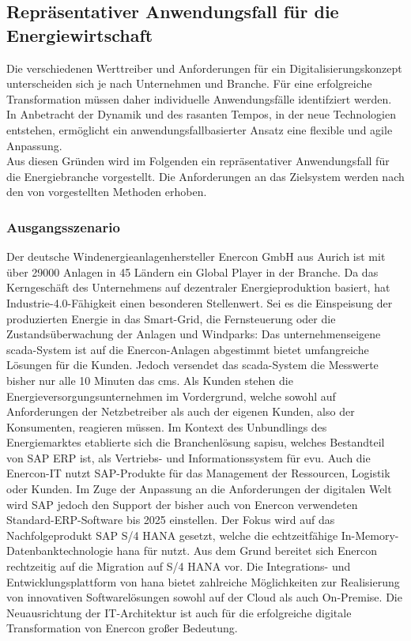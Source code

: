 \subsection{Repräsentativer Anwendungsfall für die Energiewirtschaft}\label{usecase}

Die verschiedenen Werttreiber und Anforderungen für ein Digitalisierungskonzept unterscheiden sich je nach Unternehmen und Branche.
Für eine erfolgreiche Transformation müssen daher individuelle Anwendungsfälle identifziert werden.
In Anbetracht der Dynamik und des rasanten Tempos, in der neue Technologien entstehen,
ermöglicht ein anwendungsfallbasierter Ansatz eine flexible und agile Anpassung. \citep[S. 31]{Acharya2019}
\\Aus diesen Gründen wird im Folgenden ein repräsentativer Anwendungsfall für die Energiebranche vorgestellt. Die Anforderungen an das Zielsystem werden nach den von \citet{Lauenroth2016} vorgestellten Methoden erhoben.

\subsubsection{Ausgangsszenario} \label{usecase}

Der deutsche Windenergieanlagenhersteller Enercon GmbH aus Aurich ist mit über 29000 Anlagen in 45 Ländern ein Global Player in der Branche. Da das Kerngeschäft des Unternehmens auf dezentraler Energieproduktion basiert, hat Industrie-4.0-Fähigkeit einen besonderen Stellenwert. Sei es die Einspeisung der produzierten Energie in das Smart-Grid, die Fernsteuerung oder die Zustandsüberwachung der Anlagen und Windparks: Das unternehmenseigene \acf{scada}-System ist auf die Enercon-Anlagen abgestimmt bietet umfangreiche Lösungen für die Kunden. Jedoch versendet das \ac{scada}-System die Messwerte bisher nur alle 10 Minuten das \ac{cms}. Als Kunden stehen die Energieversorgungsunternehmen im Vordergrund, welche sowohl auf Anforderungen der Netzbetreiber als auch der eigenen Kunden, also der Konsumenten, reagieren müssen. Im Kontext des Unbundlings des Energiemarktes etablierte sich die Branchenlösung \acf{sapisu}, welches Bestandteil von SAP ERP ist, als Vertriebs- und Informationssystem für \ac{evu}. Auch die Enercon-IT nutzt SAP-Produkte für das Management der Ressourcen, Logistik oder Kunden. Im Zuge der Anpassung an die Anforderungen der digitalen Welt wird SAP jedoch den Support der bisher auch von Enercon verwendeten Standard-ERP-Software bis 2025 einstellen. Der Fokus wird auf das Nachfolgeprodukt SAP S/4 HANA gesetzt, welche die echtzeitfähige In-Memory-Datenbanktechnologie \acf{hana} für nutzt. Aus dem Grund bereitet sich Enercon rechtzeitig auf die Migration auf S/4 HANA vor. Die Integrations- und Entwicklungsplattform von \ac{hana} bietet zahlreiche Möglichkeiten zur Realisierung von innovativen Softwarelösungen sowohl auf der Cloud als auch On-Premise. Die Neuausrichtung der IT-Architektur ist auch für die erfolgreiche digitale Transformation von Enercon großer Bedeutung.

